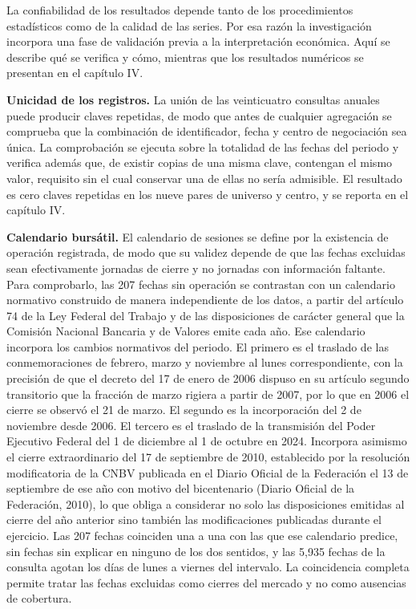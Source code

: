 La confiabilidad de los resultados depende tanto de los procedimientos estadísticos como de la calidad de las series. Por esa razón la investigación incorpora una fase de validación previa a la interpretación económica. Aquí se describe qué se verifica y cómo, mientras que los resultados numéricos se presentan en el capítulo IV.

\textbf{Unicidad de los registros.} La unión de las veinticuatro consultas anuales puede producir claves repetidas, de modo que antes de cualquier agregación se comprueba que la combinación de identificador, fecha y centro de negociación sea única. La comprobación se ejecuta sobre la totalidad de las fechas del periodo y verifica además que, de existir copias de una misma clave, contengan el mismo valor, requisito sin el cual conservar una de ellas no sería admisible. El resultado es cero claves repetidas en los nueve pares de universo y centro, y se reporta en el capítulo IV.

\textbf{Calendario bursátil.} El calendario de sesiones se define por la existencia de operación registrada, de modo que su validez depende de que las fechas excluidas sean efectivamente jornadas de cierre y no jornadas con información faltante. Para comprobarlo, las 207 fechas sin operación se contrastan con un calendario normativo construido de manera independiente de los datos, a partir del artículo 74 de la Ley Federal del Trabajo y de las disposiciones de carácter general que la Comisión Nacional Bancaria y de Valores emite cada año. Ese calendario incorpora los cambios normativos del periodo. El primero es el traslado de las conmemoraciones de febrero, marzo y noviembre al lunes correspondiente, con la precisión de que el decreto del 17 de enero de 2006 dispuso en su artículo segundo transitorio que la fracción de marzo rigiera a partir de 2007, por lo que en 2006 el cierre se observó el 21 de marzo. El segundo es la incorporación del 2 de noviembre desde 2006. El tercero es el traslado de la transmisión del Poder Ejecutivo Federal del 1 de diciembre al 1 de octubre en 2024. Incorpora asimismo el cierre extraordinario del 17 de septiembre de 2010, establecido por la resolución modificatoria de la CNBV publicada en el Diario Oficial de la Federación el 13 de septiembre de ese año con motivo del bicentenario (Diario Oficial de la Federación, 2010), lo que obliga a considerar no solo las disposiciones emitidas al cierre del año anterior sino también las modificaciones publicadas durante el ejercicio. Las 207 fechas coinciden una a una con las que ese calendario predice, sin fechas sin explicar en ninguno de los dos sentidos, y las 5,935 fechas de la consulta agotan los días de lunes a viernes del intervalo. La coincidencia completa permite tratar las fechas excluidas como cierres del mercado y no como ausencias de cobertura.


